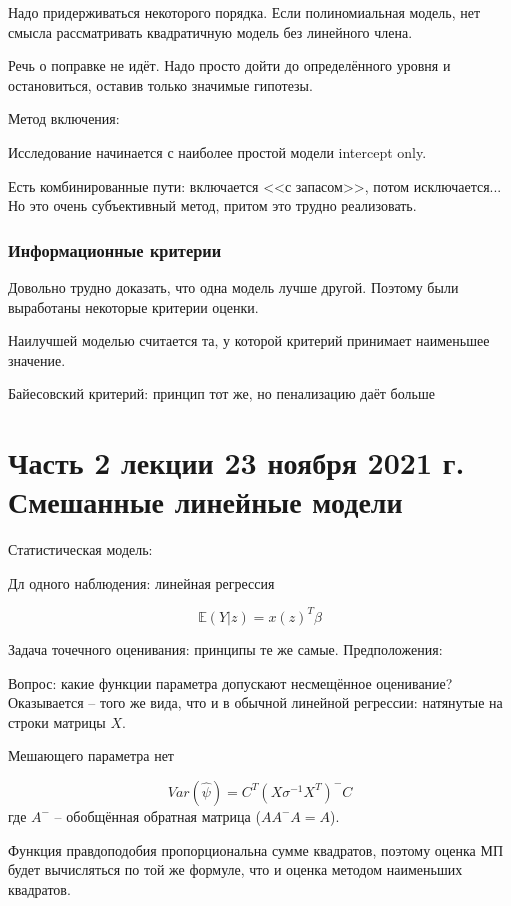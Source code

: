 \documentclass[main.tex]{subfiles}
\begin{document}
Надо придерживаться некоторого порядка.
Если полиномиальная модель, нет смысла рассматривать квадратичную модель без линейного члена.

Речь о поправке не идёт.
Надо просто дойти до определённого уровня и остановиться, оставив только значимые гипотезы.

Метод включения:

Исследование начинается с наиболее простой модели intercept only.


Есть комбинированные пути: включается <<с запасом>>, потом исключается...
Но это очень субъективный метод, притом это трудно реализовать.

\subsubsection{Информационные критерии}

Довольно трудно доказать, что одна модель лучше другой.
Поэтому были выработаны некоторые критерии оценки.

Наилучшей моделью считается та, у которой критерий принимает наименьшее значение.

Байесовский критерий: принцип тот же, но пенализацию даёт больше 

\section{ Часть 2 лекции 23 ноября 2021 г. Смешанные линейные модели }

Статистическая модель:

Дл одного наблюдения: линейная регрессия

\[ \mathds E (Y|z) = x(z)^T \beta \]


Задача точечного оценивания: принципы те же самые.
Предположения: %

Вопрос: какие функции параметра допускают несмещённое оценивание?
Оказывается -- того же вида, что и в обычной линейной регрессии: натянутые на строки матрицы $ X $.

Мешающего параметра нет

\[ Var(\hat \psi ) = C^T (X \sigma^{-1}X^T)^- C \]
где $ A^- $ -- обобщённая обратная матрица ($ A A^- A = A $).

Функция правдоподобия пропорциональна сумме квадратов, поэтому оценка МП будет вычисляться по той же формуле, что и оценка методом наименьших квадратов.
\end{document}
